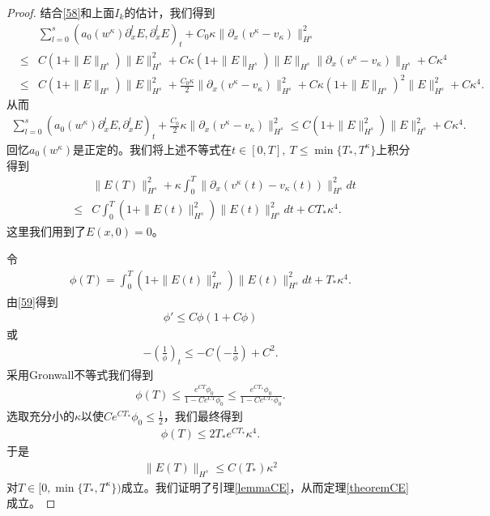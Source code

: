 \begin{proof}
结合\eqref{58}和上面$I_k$的估计，我们得到
\begin{eqnarray*}
 && \sum_{l=0}^s  (a_0(w^\kappa) \partial^l_x E,\partial^l_x E)_t + C_0 \kappa \|\partial_x (v^\kappa-v_\kappa)\|_{H^s}^2 \\
 &\le& C (1+\|E\|_{H^s})\|E\|_{H^s}^2 + C \kappa(1+\|E\|_{H^s})\|E\|_{H^s} \|\partial_x(v^\kappa-v_\kappa)\|_{H^s} + C \kappa^4  \\
 &\le& C (1+\|E\|_{H^s})\|E\|_{H^s}^2 + \frac{C_0\kappa}{2} \|\partial_x(v^\kappa-v_\kappa)\|_{H^s}^2 + C \kappa (1+\|E\|_{H^s})^2 \|E\|_{H^s}^2 + C \kappa^4.
\end{eqnarray*}
从而
\begin{eqnarray*}
  \sum_{l=0}^s  (a_0(w^\kappa) \partial^l_x E,\partial^l_x E)_t + \frac{C_0}{2} \kappa \|\partial_x (v^\kappa-v_\kappa)\|_{H^s}^2 \le   C (1+\|E\|_{H^s}^2)\|E\|_{H^s}^2 + C \kappa^4.
\end{eqnarray*}
回忆$a_0(w^\kappa)$是正定的。我们将上述不等式在$t \in [0,T],\ T \le \min \{T_*,T^\kappa\}$上积分得到
\begin{eqnarray} \label{59}
 && \|E(T)\|_{H^s}^2 + \kappa \int_0^T \|\partial_x(v^\kappa(t)-v_\kappa(t))\|_{H^s}^2 dt \nonumber \\
& \le &  C\int_0^T (1+\|E(t)\|_{H^s}^2)\|E(t)\|_{H^s}^2 dt +CT_* \kappa^4.
\end{eqnarray}
这里我们用到了$E(x, 0)=0$。

令
\begin{eqnarray*}
  \phi(T) =  \int_0^T (1+\|E(t)\|_{H^s}^2)\|E(t)\|_{H^s}^2 dt + T_* \kappa^4.
\end{eqnarray*}
由\eqref{59}得到
\begin{eqnarray*}
  \phi' \le C  \phi(1+C\phi)
\end{eqnarray*}
或
\begin{eqnarray*}
  -(\frac{1}{\phi})_t \le -C (-\frac{1}{\phi})+C^2.
\end{eqnarray*}
采用Gronwall不等式我们得到
\begin{eqnarray*}
  \phi(T) \le \frac{e^{CT} \phi_0}{1-C e^{CT}  \phi_0}\le\frac{e^{CT_*} \phi_0}{1-C e^{CT_*} \phi_0} .
\end{eqnarray*}
选取充分小的$\kappa$以使$C e^{CT_*} \phi_0 \le \frac{1}{2}$，我们最终得到
\begin{eqnarray*}
  \phi(T) \le 2T_*e^{CT_*}\kappa^4.
\end{eqnarray*}
于是
\begin{eqnarray*}
  \|E(T)\|_{H^s} \le C(T_*) \kappa^2
\end{eqnarray*}
对$T \in [0,\min\{T_*,T^\kappa\})$成立。我们证明了引理\ref{lemmaCE}，从而定理\ref{theoremCE}成立。
\end{proof}

% 
% 






